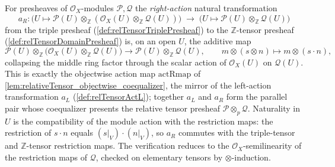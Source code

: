 \begin{definition}
  \label{def:relTensorActR}
  For presheaves of \(\mathcal{O}_X\)-modules \(\mathcal{P}, \mathcal{Q}\) the
  \emph{right-action} natural transformation
  \[
    a_R : \bigl(U \mapsto \mathcal{P}(U) \otimes_{\mathbb{Z}}
      (\mathcal{O}_X(U) \otimes_{\mathbb{Z}} \mathcal{Q}(U))\bigr)
    \;\longrightarrow\;
    \bigl(U \mapsto \mathcal{P}(U) \otimes_{\mathbb{Z}} \mathcal{Q}(U)\bigr)
  \]
  from the triple presheaf (\cref{def:relTensorTriplePresheaf}) to the
  \(\mathbb{Z}\)-tensor presheaf (\cref{def:relTensorDomainPresheaf}) is, on an
  open \(U\), the additive map
  \[
    \mathcal{P}(U) \otimes_{\mathbb{Z}}
      \bigl(\mathcal{O}_X(U) \otimes_{\mathbb{Z}} \mathcal{Q}(U)\bigr)
    \longrightarrow
    \mathcal{P}(U) \otimes_{\mathbb{Z}} \mathcal{Q}(U),
    \qquad
    m \otimes (s \otimes n) \longmapsto m \otimes (s \cdot n),
  \]
  collapsing the middle ring factor through the scalar action of
  \(\mathcal{O}_X(U)\) on \(\mathcal{Q}(U)\). This is exactly the objectwise
  action map \(\mathrm{actRmap}\) of
  \cref{lem:relativeTensor_objectwise_coequalizer}, the mirror of the left-action
  transformation \(a_L\) (\cref{def:relTensorActL}); together \(a_L\) and \(a_R\)
  form the parallel pair whose coequalizer presents the relative tensor presheaf
  \(\mathcal{P} \otimes_p \mathcal{Q}\). Naturality in \(U\) is the compatibility
  of the module action with the restriction maps: the restriction of
  \(s \cdot n\) equals \((s|_V) \cdot (n|_V)\), so \(a_R\) commutes with the
  triple-tensor and \(\mathbb{Z}\)-tensor restriction maps. The verification
  reduces to the \(\mathcal{O}_X\)-semilinearity of the restriction maps of
  \(\mathcal{Q}\), checked on elementary tensors by \(\otimes\)-induction.
\end{definition}

